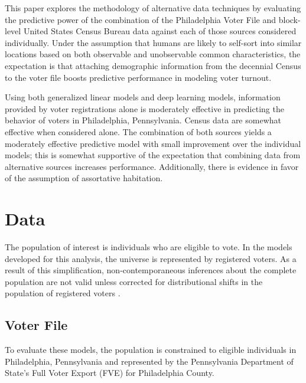 \documentclass[12pt]{article}
\begin{document}
This paper explores the methodology of alternative data techniques by evaluating the predictive power of the combination of the Philadelphia Voter File and block-level United States Census Bureau data against each of those sources considered individually. Under the assumption that humans are likely to self-sort into similar locations based on both observable and unobservable common characteristics, the expectation is that attaching demographic information from the decennial Census to the voter file boosts predictive performance in modeling voter turnout. 

Using both generalized linear models and deep learning models, information provided by voter registrations alone is moderately effective in predicting the behavior of voters in Philadelphia, Pennsylvania. Census data are somewhat effective when considered alone. The combination of both sources yields a moderately effective predictive model with small improvement over the individual models; this is somewhat supportive of the expectation that combining data from alternative sources increases performance. Additionally, there is evidence in favor of the assumption of assortative habitation.


\section{Data}

The population of interest is individuals who are eligible to vote. In the models developed for this analysis, the universe is represented by registered voters. As a result of this simplification, non-contemporaneous inferences about the complete population are not valid unless corrected for distributional shifts in the population of registered voters \cite{Brendan:2917aa}.

\subsection{Voter File}
To evaluate these models, the population is constrained to eligible individuals in Philadelphia, Pennsylvania and represented by the Pennsylvania Department of State's Full Voter Export (FVE) for Philadelphia County. 
\end{document}

